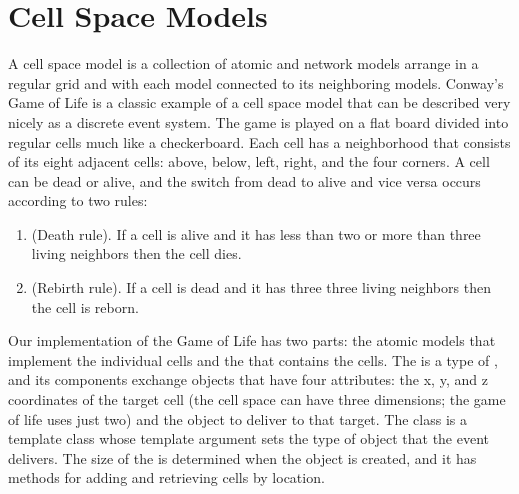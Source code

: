 \section{Cell Space Models}
A cell space model is a collection of atomic and network models arrange in a regular grid and with each model connected to its neighboring models. Conway's Game of Life is a classic example of a cell space model that can be described very nicely as a discrete event system. The game is played on a flat board divided into regular cells much like a checkerboard. Each cell has a neighborhood that consists of its eight adjacent cells: above, below, left, right, and the four corners. A cell can be dead or alive, and the switch from dead to alive and vice versa occurs according to two rules:
\begin{enumerate}
\item (Death rule). If a cell is alive and it has less than two or more than three living neighbors then the cell dies.
\item (Rebirth rule). If a cell is dead and it has three three living neighbors then the cell is reborn.
\end{enumerate}

Our implementation of the Game of Life has two parts: the atomic models that implement the individual cells and the  that contains the cells. The  is a type of , and its components exchange  objects that have four attributes: the x, y, and z coordinates of the target cell (the cell space can have three dimensions; the game of life uses just two) and the object to deliver to that target. The  class is a template class whose template argument sets the type of object that the event delivers. The size of the  is determined when the  object is created, and it has methods for adding and retrieving cells by location. 

